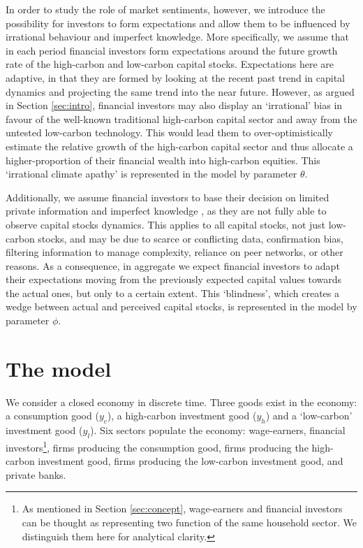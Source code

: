 \documentclass[authoryear]{article}
\begin{document}
In order to study the role of market sentiments, however, we introduce the possibility for investors to form expectations and allow them to be influenced by irrational behaviour and imperfect knowledge. More specifically, we assume that in each period financial investors form expectations around the future growth rate of the high-carbon and low-carbon capital stocks. Expectations here are adaptive, in that they are formed by looking at the recent past trend in capital dynamics and projecting the same trend into the near future. However, as argued in Section \ref{sec:intro}, financial investors may also display an `irrational' bias in favour of the well-known traditional high-carbon capital sector and away from the untested low-carbon technology. This would lead them to over-optimistically estimate the relative growth of the high-carbon capital sector and thus allocate a higher-proportion of their financial wealth into high-carbon equities. This `irrational climate apathy' is represented in the model by parameter $\theta$. 

Additionally, we assume financial investors to base their decision on limited private information and imperfect knowledge \citep{Daniel1998}, as they are not fully able to observe capital stocks dynamics. This applies to all capital stocks, not just low-carbon stocks, and may be due to scarce or conflicting data, confirmation bias, filtering information to manage complexity, reliance on peer networks, or other reasons. As a consequence, in aggregate we expect financial investors to adapt their expectations moving from the previously expected capital values towards the actual ones, but only to a certain extent. This `blindness', which creates a wedge between actual and perceived capital stocks, is represented in the model by parameter $\phi$.


\section{The model}
\label{sec:model}

We consider a closed economy in discrete time. Three goods exist in the economy: a consumption good ($y_c$), a high-carbon investment good ($y_h$) and a `low-carbon' investment good ($y_l$). Six sectors populate the economy: wage-earners, financial investors\footnote{As mentioned in Section \ref{sec:concept}, wage-earners and financial investors can be thought as representing two function of the same household sector. We distinguish them here for analytical clarity.}, firms producing the consumption good, firms producing the high-carbon investment good, firms producing the low-carbon investment good, and private banks. 
\end{document}
